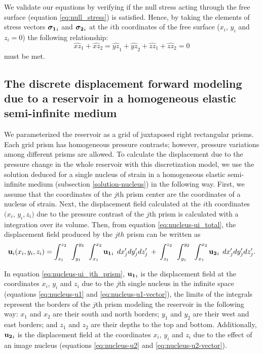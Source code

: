 \documentclass[journal abbreviation, manuscript]{copernicus}
\begin{document}
We validate our equations by verifying if the null stress acting through the free surface (equation \ref{eq:null_stress}) is satisfied.
Hence, by taking the elements of stress vectors $\mbox{\boldmath$\sigma_{1}$}_{i}$ and 
$\mbox{\boldmath$\sigma_{2}$}_{i}$  at the $i$th coordinates of the free surface ($x_i$, $y_i$ and $z_i = 0$) the following relationship:
\begin{equation}
{\widehat{xz}_{1}} + {\widehat{xz}_{2}} = {\widehat{yz}_{1}} + {\widehat{yz}_{2}}
+ {\widehat{zz}_{1}} + {\widehat{zz}_{2}}  = 0
\label{eq:null_stress_i}
\end{equation}
must be met.


\subsection{The discrete displacement forward modeling due to a reservoir in a homogeneous elastic semi-infinite medium} \label{u-model}


We parameterized the reservoir as a grid of juxtaposed right rectangular prisms.
Each grid prism has homogeneous pressure contrasts; however, pressure variations among different prisms are allowed. 
To calculate the displacement due to the pressure change in the whole reservoir with this discretization model, we use the solution deduced for a single nucleus of strain in a homogeneous elastic semi-infinite medium (subsection \ref{solution-nucleus}) in the following way. 
First, we assume that the coordinates of the $j$th prism center are the coordinates of a nucleus of strain.
Next, the displacement field calculated at the $i$th coordinates  $(x_i$, $y_i, z_i)$  due to the pressure contrast of the $j$th prism is calculated with a integration over its volume.
Then, from equation \ref{eq:nucleus-ui_total}, the displacement field produced by the $jth$ prism can be written as 
\begin{equation}
{\bf{u}}_{i} (x_i,y_i,z_i) =  
\int_{z_1}^{z_2} \:\:
\int_{y_1}^{y_2} \:\: 
\int_{x_1}^{x_2} 
{\bf{u_{1}}}_{i} \: \:  dx^{\prime}_j dy^{\prime}_j dz^{\prime}_j 
\: + \:
\int_{z_1}^{z_2} \:\:
\int_{y_1}^{y_2} \:\: 
\int_{x_1}^{x_2} 
{\bf{u_{2}}}_{i} \:\:  dx^{\prime}_j dy^{\prime}_j dz^{\prime}_j.
\label{eq:nucleus-ui_jth_prism}
\end{equation}

In equation \ref{eq:nucleus-ui_jth_prism},  ${\bf{u_{1}}}_{i}$ is the displacement field at the coordinates $x_i$, $y_i$  and $z_i$  due to the $j$th single nucleus in the infinite space (equations \ref{eq:nucleus-u1} and  \ref{eq:nucleus-u1-vector}), the limits of the integrals represent the borders of the $j$th prism modeling the reservoir in the following way: $x_1$ and $x_2$ are their south and north borders; $y_1$ and  $y_2$ are their  west and east borders;  and $z_1$ and $z_2$ are their depths to the top and bottom.
Additionally, ${\bf{u_{2}}}_{i}$ is the displacement field at the coordinates $x_i$, $y_i$  and $z_i$  due to the effect of an image nucleus (equations \ref{eq:nucleus-u2} and  \ref{eq:nucleus-u2-vector}). 
 
\end{document}
